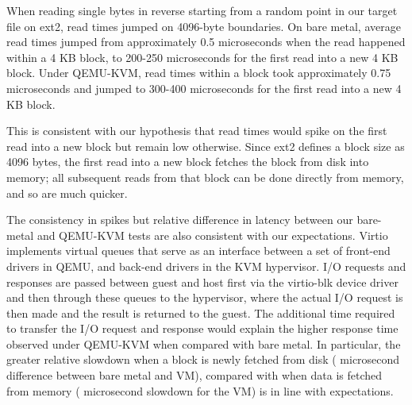 \documentclass[letterpaper,twocolumn,10pt]{article}
\begin{document}
When reading single bytes in reverse starting from a random point in our target file on ext2, read times jumped on 4096-byte boundaries. 
On bare metal, average read times jumped from approximately 0.5 microseconds when the read happened within a 4 KB block, to 200-250 microseconds for the first read into a new 4 KB block. 
Under QEMU-KVM, read times within a block took approximately 0.75 microseconds and jumped to 300-400 microseconds for the first read into a new 4 KB block.  

This is consistent with our hypothesis that read times would spike on the first read into a new block but remain low otherwise. 
Since ext2 defines a block size as 4096 bytes, the first read into a new block fetches the block from disk into memory; all subsequent reads from that block can be done directly from memory, and so are much quicker.

The consistency in spikes but relative difference in latency between our bare-metal and QEMU-KVM tests are also consistent with our expectations. 
Virtio implements virtual queues that serve as an interface between a set of front-end drivers in QEMU, and back-end drivers in the KVM hypervisor. 
I/O requests and responses are passed between guest and host first via the virtio-blk device driver and then through these queues to the hypervisor, where the actual I/O request is then made and the result is returned to the guest. 
The additional time required to transfer the I/O request and response would explain the higher response time observed under QEMU-KVM when compared with bare metal. 
In particular, the greater relative slowdown when a block is newly fetched from disk ( microsecond difference between bare metal and VM), compared with when data is fetched from memory ( microsecond slowdown for the VM) is in line with expectations. 
\end{document}
